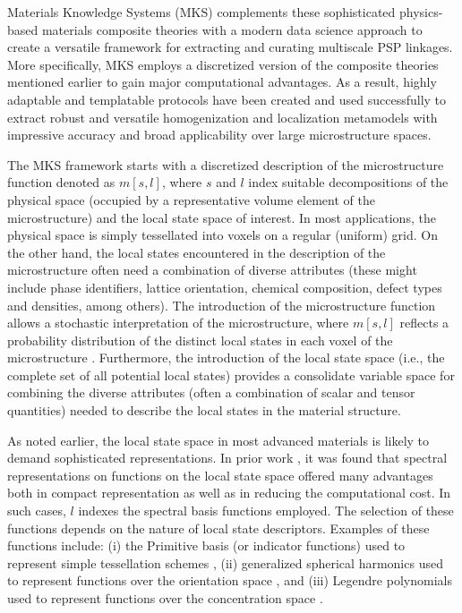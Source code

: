 \documentclass{bmcart}
\begin{document}
 Materials Knowledge Systems (MKS) \cite{landi2010multi, kalidindi2010novel, yabansu2014calibrated, al2012multi, kalidindi2011microstructure, gupta2015structure,  cceccen2014data} complements these sophisticated physics-based materials composite theories with a modern data science approach to create a versatile framework for extracting and curating multiscale PSP linkages. More specifically, MKS employs a discretized version of the composite theories mentioned earlier to gain major computational advantages. As a result, highly adaptable and templatable protocols have been created and used successfully to extract robust and versatile homogenization and localization metamodels with impressive accuracy and broad applicability over large microstructure spaces.

 The MKS framework starts with a discretized description of the microstructure function denoted as $m[s, l]$, where $s$ and $l$ index suitable decompositions of the physical space (occupied by a representative volume element of the microstructure) and the local state space of interest. In most applications, the physical space is simply tessellated into voxels on a regular (uniform) grid. On the other hand, the local states encountered in the description of the microstructure often need a combination of diverse attributes (these might include phase identifiers, lattice orientation, chemical composition, defect types and densities, among others). The introduction of the microstructure function allows a stochastic interpretation of the microstructure, where $m[s, l]$ reflects a probability distribution of the distinct local states in each voxel of the microstructure \cite{niezgoda2013novel, niezgoda2011understanding, qidwai2012estimating,niezgoda2010optimized}. Furthermore, the introduction of the local state space (i.e., the complete set of all potential local states) provides a consolidate variable space for combining the diverse attributes (often a combination of scalar and tensor quantities)  needed to describe the  local states in the material structure.

 As noted earlier, the local state space in most advanced materials is likely to demand sophisticated representations. In prior work \cite{yabansu2014calibrated, yabansu2015representation, brough2016microstructure}, it was found that spectral representations on functions on the local state space offered many advantages both in compact representation as well as in reducing the computational cost. In such cases, $l$ indexes the spectral basis functions employed. The selection of these functions depends on the nature of local state descriptors. Examples of these functions include: (i) the Primitive basis (or indicator functions) used to represent simple tessellation schemes \cite{landi2010multi, kalidindi2010novel, al2012multi, kalidindi2011microstructure, gupta2015structure,  cceccen2014data, niezgoda2013novel, niezgoda2011understanding, cecen2016versatile}, (ii) generalized spherical harmonics used to represent functions over the orientation space \cite{yabansu2014calibrated, yabansu2015representation}, and (iii) Legendre polynomials used to represent functions over the concentration space \cite{brough2016microstructure}.
\end{document}
